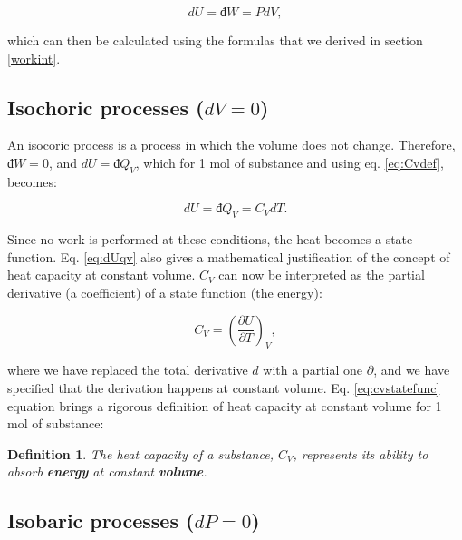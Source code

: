 \documentclass[
]{book}
\theoremstyle{definition}
\newtheorem{definition}{Definition}[chapter]
\theoremstyle{definition}
\theoremstyle{definition}
\theoremstyle{remark}
\begin{document}
\begin{equation}
  dU=đ W=PdV,
  \label{eq:dUadiabatic}
\end{equation}

which can then be calculated using the formulas that we derived in section \ref{workint}.

\hypertarget{isochoric-processes-dv0}{%
\subsection{\texorpdfstring{Isochoric processes (\(dV=0\))}{Isochoric processes (dV=0)}}\label{isochoric-processes-dv0}}

An isocoric process is a process in which the volume does not change. Therefore, \(đ W=0\), and \(dU = đ Q_V\), which for 1 mol of substance and using eq. \eqref{eq:Cvdef}, becomes:

\begin{equation}
  dU = đ Q_V = C_V dT.
  \label{eq:dUqv}
\end{equation}

Since no work is performed at these conditions, the heat becomes a state function. Eq. \eqref{eq:dUqv} also gives a mathematical justification of the concept of heat capacity at constant volume. \(C_V\) can now be interpreted as the partial derivative (a coefficient) of a state function (the energy):

\begin{equation}
  C_V = \left( \frac{\partial U} {\partial T} \right)_V,
  \label{eq:cvstatefunc}
\end{equation}

where we have replaced the total derivative \(d\) with a partial one \(\partial\), and we have specified that the derivation happens at constant volume. Eq. \eqref{eq:cvstatefunc} equation brings a rigorous definition of heat capacity at constant volume for 1 mol of substance:

\begin{definition}
\protect\hypertarget{def:newdefcv}{}{\label{def:newdefcv} }\emph{The heat capacity of a substance, \(C_V\), represents its ability to absorb \textbf{energy} at constant \textbf{volume}.}
\end{definition}

\hypertarget{isobaric-processes-dp0}{%
\subsection{\texorpdfstring{Isobaric processes (\(dP=0\))}{Isobaric processes (dP=0)}}\label{isobaric-processes-dp0}}
\end{document}

